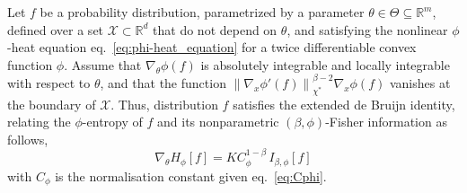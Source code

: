 \documentclass[entropy,article,submit,moreauthors,pdftex]{Definitions/mdpi}
\def\Rset{\mathbb{R}}
\def\X{\mathcal{X}}
\begin{document}
\begin{Proposition}
\label{prop:phiDeBruijn}
%
  Let $f$ be a probability distribution, parametrized by a parameter $\theta \in
  \Theta \subseteq \Rset^m$, defined over a set $\X \subset \Rset^d$ that do not
  depend  on  $\theta$,  and   satisfying  the  nonlinear  $\phi$-heat  equation
  eq.~\eqref{eq:phi-heat_equation}  for a  twice differentiable  convex function
  $\phi$.   Assume that  $\nabla_\theta  \phi(f)$ is  absolutely integrable  and
  locally integrable  with respect to  $\theta$, and that the  function $\left\|
  \nabla_x  \phi'(f) \right\|_{\chi^*}^{\beta-2}  \nabla_x \phi(f)$  vanishes at
  the boundary of $\X$.  Thus, distribution $f$ satisfies the extended de Bruijn
  identity,   relating  the   $\phi$-entropy  of   $f$  and   its  nonparametric
  $(\beta,\phi)$-Fisher information as follows,
  \begin{equation}
  \label{eq:phiDeBruijn}
  \nabla_\theta H_\phi[f] = K C_\phi^{1-\beta} \, I_{\beta,\phi}[f]
  \end{equation}
  with $C_\phi$ is the normalisation constant given eq.~\eqref{eq:Cphi}.
\end{Proposition}
\end{document}

